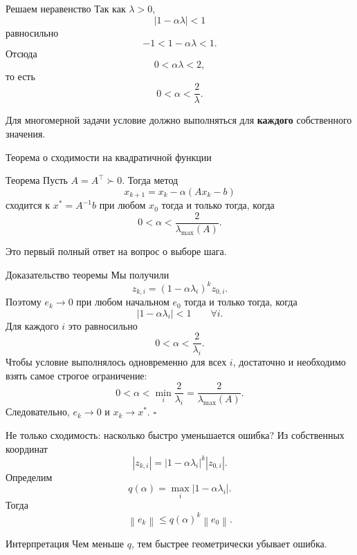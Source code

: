 \documentclass[aspectratio=169,10pt]{beamer}
\newcommand{\norm}[1]{\left\lVert #1\right\rVert}
\newcommand{\lammax}{\lambda_{\max}}
\begin{document}
\begin{frame}{Решаем неравенство}
\small
Так как $\lambda>0$,
\[
 |1-\alpha\lambda|<1
\]
равносильно
\[
 -1<1-\alpha\lambda<1.
\]
Отсюда
\[
 0<\alpha\lambda<2,
\]
то есть
\[
 \boxed{
 0<\alpha<\frac2\lambda.
 }
\]

Для многомерной задачи условие должно выполняться для \textbf{каждого} собственного значения.
\end{frame}

\begin{frame}{Теорема о сходимости на квадратичной функции}
\small
\begin{block}{Теорема}
Пусть $A=A^\top\succ0$. Тогда метод
\[
 x_{k+1}=x_k-\alpha(Ax_k-b)
\]
сходится к $x^*=A^{-1}b$ при любом $x_0$ тогда и только тогда, когда
\[
 \boxed{
 0<\alpha<\frac{2}{\lammax(A)}.
 }
\]
\end{block}

Это первый полный ответ на вопрос о выборе шага.
\end{frame}

\begin{frame}{Доказательство теоремы}
\footnotesize
Мы получили
\[
 z_{k,i}=(1-\alpha\lambda_i)^kz_{0,i}.
\]
Поэтому $e_k\to0$ при любом начальном $e_0$ тогда и только тогда, когда
\[
 |1-\alpha\lambda_i|<1
 \qquad\forall i.
\]
Для каждого $i$ это равносильно
\[
 0<\alpha<\frac{2}{\lambda_i}.
\]
Чтобы условие выполнялось одновременно для всех $i$, достаточно и необходимо взять самое строгое ограничение:
\[
 0<\alpha<\min_i\frac2{\lambda_i}
 =\frac2{\lammax(A)}.
\]
Следовательно, $e_k\to0$ и $x_k\to x^*$. \hfill$\square$
\end{frame}

\begin{frame}{Не только сходимость: насколько быстро уменьшается ошибка?}
\small
Из собственных координат
\[
 |z_{k,i}|
 =|1-\alpha\lambda_i|^k|z_{0,i}|.
\]
Определим
\[
 \boxed{
 q(\alpha)=\max_i|1-\alpha\lambda_i|.
 }
\]
Тогда
\[
 \boxed{
 \norm{e_k}\le q(\alpha)^k\norm{e_0}.
 }
\]

\begin{block}{Интерпретация}
Чем меньше $q$, тем быстрее геометрически убывает ошибка.
\end{block}
\end{frame}
\end{document}

